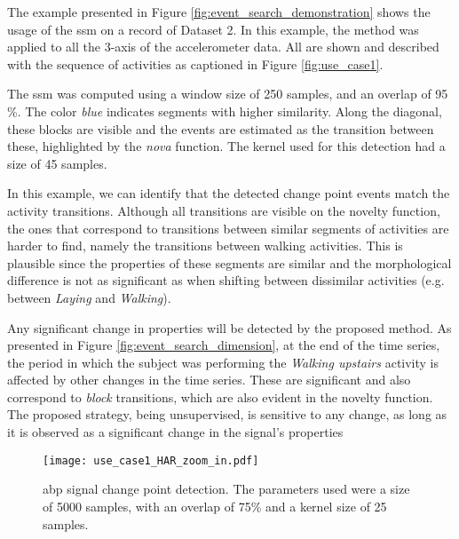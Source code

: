 {The example presented in Figure \ref{fig:event_search_demonstration} shows the usage of the \gls{ssm} on a record of Dataset 2. In this example, the method was applied to all the 3-axis of the accelerometer data. All are shown and described with the sequence of activities as captioned in Figure \ref{fig:use_case1}.
\par
The \gls{ssm} was computed using a window size of 250 samples, and an overlap of 95 \%. The color \textit{blue} indicates segments with higher similarity. Along the diagonal, these blocks are visible and the events are estimated as the transition between these, highlighted by the \textit{nova} function. The kernel used for this detection had a size of 45 samples.
\par
In this example, we can identify that the detected change point events match the activity transitions. Although all transitions are visible on the novelty function, the ones that correspond to transitions between similar segments of activities are harder to find, namely the transitions between walking activities. This is plausible since the properties of these segments are similar and the morphological difference is not as significant as when shifting between dissimilar activities (e.g. between \textit{Laying} and \textit{Walking}).
\par
Any significant change in properties will be detected by the proposed method. As presented in Figure \ref{fig:event_search_dimension}, at the end of the time series, the period in which the subject was performing the \textit{Walking upstairs} activity is affected by other changes in the time series. These are significant and also correspond to \textit{block} transitions, which are also evident in the novelty function. The proposed strategy, being unsupervised, is sensitive to any change, as long as it is observed as a significant change in the signal's properties\\


\begin{figure}
    \centering
    \texttt{[image: use\_case1\_HAR\_zoom\_in.pdf]}
    \caption{\gls{abp} signal change point detection. The parameters used were a size of 5000 samples, with an overlap of 75\% and a kernel size of 25 samples.}
    \label{fig:example1_zoom}
\end{figure}

}
